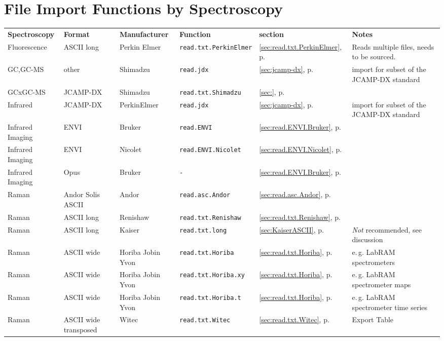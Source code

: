 \documentclass[english, a4paper, 10pt, headings=small, DIV11]{scrartcl}
\newcommand{\Rfunction}[2][]{\texorpdfstring{\nohyphens{#1\texttt{#2}}}{#2}}
\begin{document}
\section{File Import Functions by Spectroscopy}
\label{sec:spectroscopy}
\begin{footnotesize}
\begin{tabular}{@{} l l l l l >{\raggedright}p{2.7cm}}
  \textbf{Spectroscopy} &
  \textbf{Format} &
  \textbf{Manufacturer} &
  \textbf{Function} &
  \textbf{section}  &
  \textbf{Notes}\tabularnewline
Fluorescence& ASCII long & Perkin Elmer & \Rfunction{read.txt.PerkinElmer} & \ref{sec:read.txt.PerkinElmer}, p. \pageref{sec:read.txt.PerkinElmer} & Reads multiple files, needs to be sourced.\tabularnewline
GC,GC-MS& other & Shimadzu & \Rfunction{read.jdx} & \ref{sec:jcamp-dx}, p. \pageref{sec:jcamp-dx} & import for  subset of the JCAMP-DX standard\tabularnewline
GCxGC-MS& JCAMP-DX & Shimadzu & \Rfunction{read.txt.Shimadzu} & \ref{sec:}, p. \pageref{sec:} & \tabularnewline
Infrared& JCAMP-DX & PerkinElmer & \Rfunction{read.jdx} & \ref{sec:jcamp-dx}, p. \pageref{sec:jcamp-dx} & import for subset of the JCAMP-DX standard\tabularnewline
Infrared Imaging& ENVI & Bruker & \Rfunction{read.ENVI} & \ref{sec:read.ENVI.Bruker}, p. \pageref{sec:read.ENVI.Bruker} & \tabularnewline
Infrared Imaging& ENVI & Nicolet & \Rfunction{read.ENVI.Nicolet} & \ref{sec:read.ENVI.Nicolet}, p. \pageref{sec:read.ENVI.Nicolet} & \tabularnewline
Infrared Imaging& Opus & Bruker & \Rfunction{-} & \ref{sec:read.ENVI.Bruker}, p. \pageref{sec:read.ENVI.Bruker} & \tabularnewline
Raman& Andor Solis ASCII & Andor & \Rfunction{read.asc.Andor} & \ref{sec:read.asc.Andor}, p. \pageref{sec:read.asc.Andor} & \tabularnewline
Raman& ASCII long & Renishaw & \Rfunction{read.txt.Renishaw} & \ref{sec:read.txt.Renishaw}, p. \pageref{sec:read.txt.Renishaw} & \tabularnewline
Raman& ASCII long & Kaiser & \Rfunction{read.txt.long} & \ref{sec:KaiserASCII}, p. \pageref{sec:KaiserASCII} & \emph{Not} recommended, see discussion\tabularnewline
Raman& ASCII wide & Horiba Jobin Yvon & \Rfunction{read.txt.Horiba} & \ref{sec:read.txt.Horiba}, p. \pageref{sec:read.txt.Horiba} & e.\,g. LabRAM spectrometers\tabularnewline
Raman& ASCII wide & Horiba Jobin Yvon & \Rfunction{read.txt.Horiba.xy} & \ref{sec:read.txt.Horiba}, p. \pageref{sec:read.txt.Horiba} & e.\,g. LabRAM spectrometer maps\tabularnewline
Raman& ASCII wide & Horiba Jobin Yvon & \Rfunction{read.txt.Horiba.t} & \ref{sec:read.txt.Horiba}, p. \pageref{sec:read.txt.Horiba} & e.\,g. LabRAM spectrometer time series\tabularnewline
Raman& ASCII wide transposed & Witec & \Rfunction{read.txt.Witec} & \ref{sec:read.txt.Witec}, p. \pageref{sec:read.txt.Witec} & Export Table\tabularnewline

\end{tabular}
\end{footnotesize}
\end{document}
